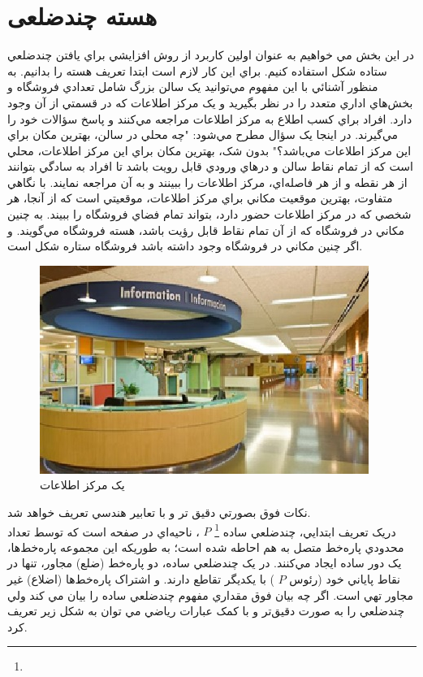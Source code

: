 \documentclass{book}
\begin{document}
	 	\section*{هسته چندضلعی}
	 	در اين بخش مي خواهيم به عنوان اولين کاربرد از روش افزايشي براي يافتن چندضلعي ستاده شکل استفاده کنيم. براي اين کار لازم است ابتدا تعريف هسته را بدانيم. به منظور آشنائي با اين مفهوم مي‌توانيد يک سالن بزرگ شامل تعدادي فروشگاه و بخش‌هاي اداري متعدد را در نظر بگيريد و يک مرکز اطلاعات که در قسمتي از آن وجود دارد. افراد براي کسب اطلاع به مرکز اطلاعات مراجعه مي‌کنند و پاسخ سؤالات خود را مي‌گيرند. در اينجا يک سؤال مطرح مي‌شود: "چه محلي در سالن، بهترين مکان براي اين مرکز اطلاعات مي‌باشد؟" بدون شک، بهترين مکان براي اين مرکز اطلاعات، محلي است که از تمام نقاط سالن و درهاي ورودي قابل رويت باشد تا افراد به سادگي بتوانند از هر نقطه و از هر فاصله‌اي، مرکز اطلاعات را ببينند و به آن مراجعه نمايند. با نگاهي متفاوت، بهترين موقعيت مکاني براي مرکز اطلاعات، موقعيتي است که از آنجا، هر شخصي که در مرکز اطلاعات حضور دارد، بتواند تمام فضاي فروشگاه را ببيند. به چنين مکاني در فروشگاه که از آن تمام نقاط قابل رؤيت باشد، هسته فروشگاه مي‌گويند. و اگر چنين مکاني در فروشگاه وجود داشته باشد فروشگاه ستاره شکل است.
	 	\begin{figure}[h]
	 		\begin{center}
	 			\includegraphics{5.jpg}
	 			\caption{یک مرکز اطلاعات}
	 		\end{center}
 		   	\label{شکل 5}
	 	\end{figure}
	 	نکات فوق بصورتي دقيق تر و با تعابير هندسي تعريف خواهد شد.\\
	 	
	 	دريک تعريف ابتدايي، چندضلعي ساده
	 	\footnote{}
	 	  $P$
	 	  ، ناحيه‌اي در صفحه است که توسط تعداد محدودي پاره‌خط متصل به هم احاطه شده است؛ به طوريکه اين مجموعه پاره‌خط‌ها، يک دور ساده ايجاد مي‌کنند. در يک چندضلعي ساده، دو پاره‌خط (ضلع) مجاور، تنها در نقاط پاياني خود (رئوس 
	 	  $P$
	 	  )
	 	  با يکديگر تقاطع دارند. و اشتراک پاره‌خط‌ها (اضلاع) غير مجاور تهي است. اگر چه بيان فوق مقداري مفهوم چندضلعي ساده را بيان مي کند ولي چندضلعي را به صورت دقيق‌تر و با کمک عبارات رياضي مي توان به شکل زير تعريف کرد.
\end{document}
